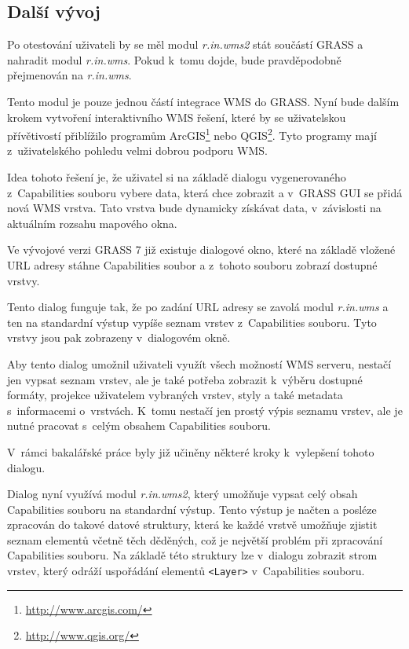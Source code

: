 \documentclass[a4paper,12pt]{article}
\begin{document}
\subsection{Další vývoj}

Po otestování uživateli by se měl modul \emph{r.in.wms2} stát součástí GRASS
a nahradit modul \emph{r.in.wms}. Pokud k~tomu dojde, bude pravděpodobně
přejmenován na \emph{r.in.wms}.

Tento modul je pouze jednou částí integrace WMS do GRASS. Nyní
bude dalším krokem vytvoření interaktivního WMS řešení, které
by se uživatelskou přívětivostí přiblížilo programům
ArcGIS\footnote{\url{http://www.arcgis.com/}} nebo
QGIS\footnote{\url{http://www.qgis.org/}}. Tyto programy mají z~uživatelského
pohledu velmi dobrou podporu WMS.

Idea tohoto řešení je, že uživatel si na základě dialogu
vygenerovaného z~Capabilities souboru vybere data, která chce zobrazit
a v~GRASS GUI se přidá nová WMS vrstva. Tato vrstva bude dynamicky
získávat data, v~závislosti na aktuálním rozsahu mapového okna.

Ve vývojové verzi GRASS 7 již existuje dialogové okno, které na základě 
vložené URL adresy stáhne Capabilities soubor a z~tohoto souboru zobrazí
dostupné vrstvy.

Tento dialog funguje tak, že po zadání URL adresy se zavolá modul
\emph{r.in.wms} a ten na standardní výstup vypíše seznam vrstev
z~Capabilities souboru. Tyto vrstvy jsou pak zobrazeny v~dialogovém
okně.

Aby tento dialog umožnil uživateli využít všech možností WMS serveru,
nestačí jen vypsat seznam vrstev, ale je také potřeba zobrazit
k~výběru dostupné formáty, projekce uživatelem vybraných vrstev, styly
 a také metadata s~informacemi o~vrstvách. K~tomu nestačí jen prostý
výpis seznamu vrstev, ale je nutné pracovat s~celým obsahem
Capabilities souboru.

V~rámci bakalářské práce byly již učiněny některé kroky k~vylepšení
tohoto dialogu.

Dialog nyní využívá modul \emph{r.in.wms2}, který umožňuje vypsat celý obsah
Capabilities souboru na standardní výstup. Tento výstup je načten a
posléze zpracován do takové datové struktury, která ke každé vrstvě
umožňuje zjistit seznam elementů včetně těch děděných, což je největší
problém při zpracování Capabilities souboru. Na základě této struktury
lze v~dialogu zobrazit strom vrstev, který odráží uspořádání elementů
{\tt <Layer>} v~Capabilities souboru.
\end{document}
